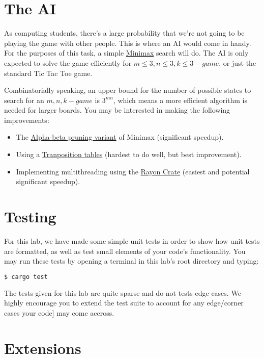 \documentclass{report}
\begin{document}
\section*{The AI}
As computing students, there's a large probability that we're not going to be
playing the game with other people. This is where an AI would come in handy. 
For the purposes of this task, a simple \href{https://en.wikipedia.org/wiki/Minimax}{Minimax}
search will do. The AI is only expected to solve the game efficiently for
$m \le 3, n \le 3, k \le 3-game$, or just the standard Tic Tac Toe game. 

Combinatorially speaking, an upper bound for the number of possible states to search 
for an $m,n,k-game$ is $3^{mn}$, which means a more efficient algorithm is needed 
for larger boards. You may be interested in making the following improvements: 
\begin{itemize}
    \item The \href{https://en.wikipedia.org/wiki/Alpha%E2%80%93beta_pruning}{Alpha-beta pruning variant} of Minimax (significant speedup).
    \item Using a \href{https://en.wikipedia.org/wiki/Transposition_table}{Tranposition tables} (hardest to do well, but best improvement).
    \item Implementing multithreading using the \href{https://crates.io/crates/rayon}{Rayon Crate} (easiest and potential significant speedup).
\end{itemize}

\section*{Testing}
For this lab, we have made some simple unit tests in order to show how unit tests
are formatted, as well as test small elements of your code's functionality.
You may run these tests by opening a terminal in this lab's root directory and typing:
\begin{lstlisting}[language=Bash]
$ cargo test
\end{lstlisting}

The tests given for this lab are quite sparse and do not tests edge cases. We highly
encourage you to extend the test suite to account for any edge/corner cases your code]
may come accross.

\section*{Extensions}
\end{document}
